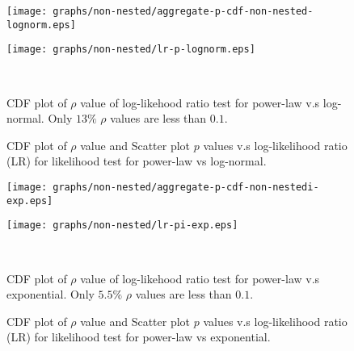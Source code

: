 \documentclass[paper]{ieice}
\begin{document}
\begin{figure*}[!tb]
\centering
\begin{minipage}[b]{.45\linewidth}
\centering
\texttt{[image: graphs/non-nested/aggregate-p-cdf-non-nested-lognorm.eps]}
\end{minipage}%
\hfill%
\begin{minipage}[b]{.45\linewidth}
\centering
\centering
\texttt{[image: graphs/non-nested/lr-p-lognorm.eps]}
\end{minipage}\\[-7pt]
\begin{minipage}[t]{.45\linewidth}
\caption{CDF plot of $\rho$ value of log-likehood ratio test for power-law v.s 
         log-normal. Only $13\%$ $\rho$ values are less than $0.1$.} 
\label{fig:cdf-p-lognorm}
\end{minipage}%
\hfill%
\begin{minipage}[t]{.45\linewidth}
\caption{CDF plot of $\rho$ value  and Scatter plot $p$ values v.s log-likelihood
         ratio (LR) for likelihood test for power-law vs log-normal.} 
\label{fig:scatter-lognorm}
\end{minipage}%
\vspace{-2mm}
\end{figure*}

\begin{figure*}[!tb]
\centering
\begin{minipage}[b]{.45\linewidth}
\centering
\texttt{[image: graphs/non-nested/aggregate-p-cdf-non-nestedi-exp.eps]}
\end{minipage}%
\hfill%
\begin{minipage}[b]{.45\linewidth}
\centering
\centering
\texttt{[image: graphs/non-nested/lr-pi-exp.eps]}
\end{minipage}\\[-7pt]
\begin{minipage}[t]{.45\linewidth}
\caption{CDF plot of $\rho$ value of log-likehood ratio test for power-law v.s exponential. 
         Only $5.5\%$ $\rho$ values are less than $0.1$.}
\label{fig:cdf-p-exp}
\end{minipage}%
\hfill%
\begin{minipage}[t]{.45\linewidth}
\caption{CDF plot of $\rho$ value  and Scatter plot $p$ values v.s log-likelihood 
         ratio (LR) for likelihood test for power-law vs exponential.} 
\label{fig:scatter-exp}
\end{minipage}%
\vspace{-2mm}
\end{figure*}
\end{document}
